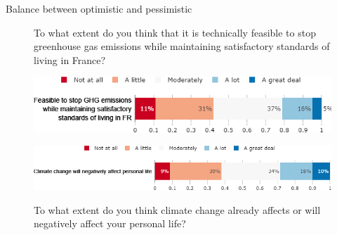 \begin{framefont}{\small}
\begin{frame}{Balance between optimistic and pessimistic}%
\begin{figure}[h!]
\caption{To what extent do you think that it is technically feasible to stop greenhouse gas emissions while maintaining satisfactory standards of living in France?}
\includegraphics[width=.7\paperwidth]{../figures/FR/net_zero_feasible_FR.png} \\
\caption{To what extent do you think climate change already affects or will negatively affect your personal life?}
\includegraphics[width=.9\paperwidth]{../figures/FR/CC_affects_self_FR.png} \\
\end{figure}
\end{frame}


\end{framefont}
